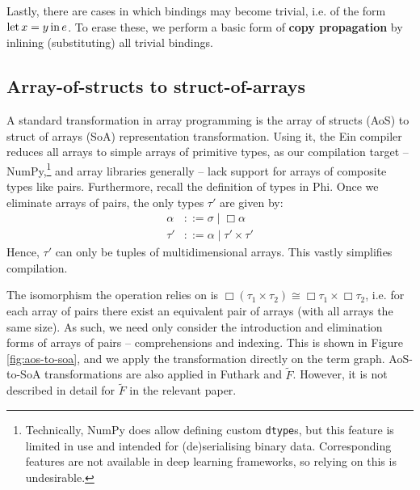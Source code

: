 Lastly, there are cases in which bindings may become trivial, i.e. of the form $\mathrm{let}\,{x}={y}\,\mathrm{in}\,{e}$. To erase these, we perform a basic form of \textbf{copy propagation} by inlining (substituting) all trivial bindings.

\subsection{Array-of-structs to struct-of-arrays}

A standard transformation in array programming is the array of structs (AoS) to struct of arrays (SoA) representation transformation. Using it, the Ein compiler reduces all arrays to simple arrays of primitive types, as our compilation target -- NumPy,\footnote{Technically, NumPy does allow defining custom \texttt{dtype}s, but this feature is limited in use and intended for (de)serialising binary data. Corresponding features are not available in deep learning frameworks, so relying on this is undesirable.} and array libraries generally -- lack support for arrays of composite types like pairs. Furthermore, recall the definition of types in Phi. Once we eliminate arrays of pairs, the only types $\tau'$ are given by:
\begin{align*}
\alpha &::= \sigma \mid \Box \alpha \\
\tau' &::= \alpha \mid \tau' \times \tau'
\end{align*}
Hence, $\tau'$ can only be tuples of multidimensional arrays. This vastly simplifies compilation. 

The isomorphism the operation relies on is $\Box (\tau_1 \times \tau_2) \cong \Box \tau_1 \times \Box \tau_2$, i.e. for each array of pairs there exist an equivalent pair of arrays (with all arrays the same size). As such, we need only consider the introduction and elimination forms of arrays of pairs -- comprehensions and indexing. This is shown in Figure \ref{fig:aos-to-soa}, and we apply the transformation directly on the term graph. AoS-to-SoA transformations are also applied in Futhark and $\tilde F$. However, it is not described in detail for $\tilde F$ in the relevant paper.

\newcommand{\phisoa}[1]{\mathcal S \left\llbracket {#1} \right\rrbracket}
\newcommand{\phitupleindex}[2]{\mathcal P \left\llbracket {#1}, {#2} \right\rrbracket}

